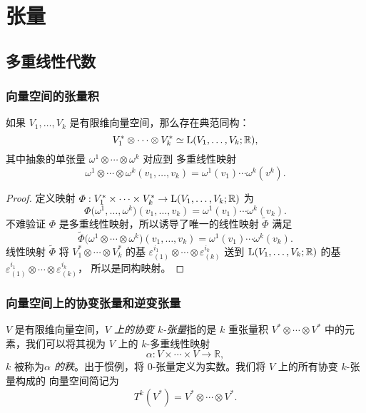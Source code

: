 
\chapter{张量}

\section{多重线性代数}

\subsection{向量空间的张量积}

\begin{proposition}
  如果 $V_1,\dots,V_k$ 是有限维向量空间，那么存在典范同构：
  \[
    V_1^*\otimes \cdots\otimes V_k^*\simeq {\mathrm{L}}(V_1,\dots,V_k;\mathbb{R}),
  \]
  其中抽象的单张量 $\omega^1\otimes \cdots\otimes\omega^k$ 对应到
  多重线性映射
  \[
    \omega^1\otimes\cdots\otimes\omega^k(v_1,\dots,v_k)=
    \omega^1(v_1)\cdots \omega^k(v^k).  
  \]
\end{proposition}
\begin{proof}
  定义映射 $\varPhi:V_1^*\times\cdots\times V_k^*\to {\mathrm{L}}(V_1,\dots,V_k;\mathbb{R})$
  为
  \[
    \varPhi\bigl(\omega^1,\dots,\omega^k\bigr)(v_1,\dots,v_k)
    =\omega^1(v_1)\cdots\omega^k(v_k).
  \]
  不难验证 $\varPhi$ 是多重线性映射，所以诱导了唯一的线性映射 
  $\tilde{\varPhi}$ 满足
  \[
    \tilde\varPhi\bigl(\omega^1\otimes\cdots\otimes\omega^k\bigr)(v_1,\dots,v_k)
    =\omega^1(v_1)\cdots\omega^k(v_k).
  \]
  线性映射 $\tilde{\varPhi}$ 将 $V_1^*\otimes\cdots\otimes V_k^*$ 的基 $\varepsilon_{(1)}^{i_1}\otimes\cdots\otimes \varepsilon_{(k)}^{i_k}$
  送到 ${\mathrm{L}}(V_1,\dots,V_k;\mathbb{R})$ 的基  $\varepsilon_{(1)}^{i_1}\otimes\cdots\otimes \varepsilon_{(k)}^{i_k}$，
  所以是同构映射。
\end{proof}

\subsection{向量空间上的协变张量和逆变张量}

$V$ 是有限维向量空间，\emph{$V$ 上的协变 $k$-张量}指的是
$k$ 重张量积 $V^*\otimes\cdots\otimes V^*$ 中的元素，我们可以将其视为
$V$ 上的 $k$-多重线性映射
\[
  \alpha:V\times\cdots\times V\to \mathbb{R},
\]
$k$ 被称为\emph{$\alpha$ 的秩}。出于惯例，将 $0$-张量定义为实数。我们将 $V$ 上的所有协变 $k$-张量构成的
向量空间简记为
\[
  T^k(V^*)=V^*\otimes\cdots\otimes V^*.
\]

